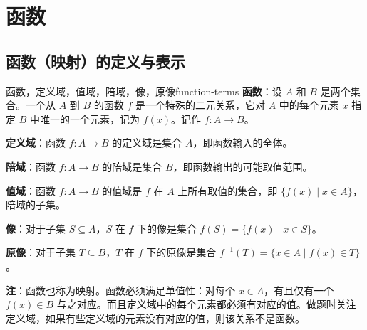 \chapter{函数}
\section{函数（映射）的定义与表示}
\begin{definition}{函数，定义域，值域，陪域，像，原像}{function-terms}
\textbf{函数}：设 $A$ 和 $B$ 是两个集合。一个从 $A$ 到 $B$ 的函数 $f$ 是一个特殊的二元关系，它对 $A$ 中的每个元素 $x$ 指定 $B$ 中唯一的一个元素，记为 $f(x)$。记作 $f: A \to B$。

\textbf{定义域}：函数 $f: A \to B$ 的定义域是集合 $A$，即函数输入的全体。

\textbf{陪域}：函数 $f: A \to B$ 的陪域是集合 $B$，即函数输出的可能取值范围。

\textbf{值域}：函数 $f: A \to B$ 的值域是 $f$ 在 $A$ 上所有取值的集合，即 $\{f(x) \mid x \in A\}$，陪域的子集。

\textbf{像}：对于子集 $S \subseteq A$，$S$ 在 $f$ 下的像是集合 $f(S) = \{f(x) \mid x \in S\}$。

\textbf{原像}：对于子集 $T \subseteq B$，$T$ 在 $f$ 下的原像是集合 $f^{-1}(T) = \{x \in A \mid f(x) \in T\}$。
\end{definition}
\textbf{注}：函数也称为映射。函数必须满足单值性：对每个 $x \in A$，有且仅有一个 $f(x) \in B$ 与之对应。而且定义域中的每个元素都必须有对应的值。做题时关注定义域，如果有些定义域的元素没有对应的值，则该关系不是函数。

